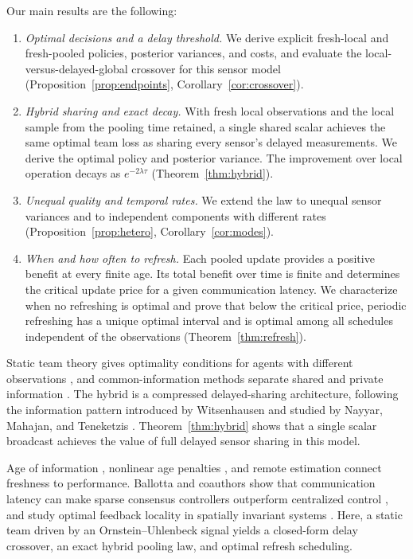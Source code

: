 \documentclass[letterpaper,10pt,conference]{ieeeconf}
\begin{document}
Our main results are the following:
\begin{enumerate}
\item \emph{Optimal decisions and a delay threshold.} We derive explicit fresh-local and fresh-pooled policies, posterior variances, and costs, and evaluate the local-versus-delayed-global crossover for this sensor model (Proposition~\ref{prop:endpoints}, Corollary~\ref{cor:crossover}).
\item \emph{Hybrid sharing and exact decay.} With fresh local observations and the local sample from the pooling time retained, a single shared scalar achieves the same optimal team loss as sharing every sensor's delayed measurements. We derive the optimal policy and posterior variance. The improvement over local operation decays as $e^{-2\lambda\tau}$ (Theorem~\ref{thm:hybrid}).
\item \emph{Unequal quality and temporal rates.} We extend the law to unequal sensor variances and to independent components with different rates (Proposition~\ref{prop:hetero}, Corollary~\ref{cor:modes}).
\item \emph{When and how often to refresh.} Each pooled update provides a positive benefit at every finite age. Its total benefit over time is finite and determines the critical update price for a given communication latency. We characterize when no refreshing is optimal and prove that below the critical price, periodic refreshing has a unique optimal interval and is optimal among all schedules independent of the observations (Theorem~\ref{thm:refresh}).
\end{enumerate}
Static team theory gives optimality conditions for agents with different observations \cite{radner1962team}, and common-information methods separate shared and private information \cite{afshari2017static}. The hybrid is a compressed delayed-sharing architecture, following the information pattern introduced by Witsenhausen \cite{witsenhausen1971separation} and studied by Nayyar, Mahajan, and Teneketzis \cite{nayyar2011sharing}. Theorem~\ref{thm:hybrid} shows that a single scalar broadcast achieves the value of full delayed sensor sharing in this model.

Age of information \cite{yates2021aoi}, nonlinear age penalties \cite{sun2017update}, and remote estimation \cite{ornee2021ou} connect freshness to performance. Ballotta and coauthors show that communication latency can make sparse consensus controllers outperform centralized control \cite{ballotta2023latency}, and study optimal feedback locality in spatially invariant systems \cite{ballotta2026role}. Here, a static team driven by an Ornstein--Uhlenbeck signal yields a closed-form delay crossover, an exact hybrid pooling law, and optimal refresh scheduling.
\end{document}
